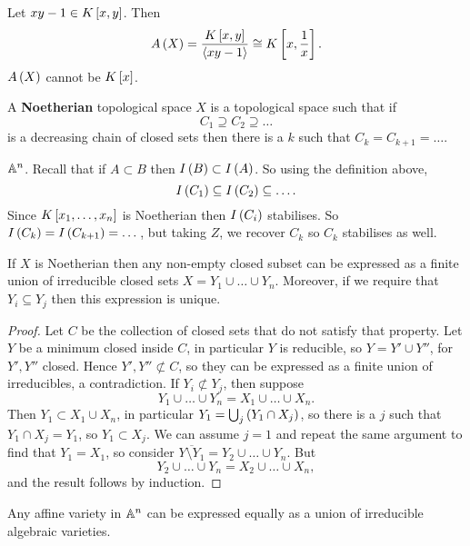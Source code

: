 \begin{example}
Let $ xy - 1 \in K\sb{x, y} $. Then
$$ A\rb{X} = \dfrac{K\sb{x, y}}{\ab{xy - 1}} \cong K\sb{x, \dfrac{1}{x}}. $$
$ A\rb{X} $ cannot be $ K\sb{x} $.
\end{example}

\begin{definition}
A \textbf{Noetherian} topological space $ X $ is a topological space such that if
$$ C_1 \supseteq C_2 \supseteq \dots $$
is a decreasing chain of closed sets then there is a $ k $ such that $ C_k = C_{k + 1} = \dots $.
\end{definition}

\begin{example}
$ \A^n $. Recall that if $ A \subset B $ then $ I\rb{B} \subset I\rb{A} $. So using the definition above,
$$ I\rb{C_1} \subseteq I\rb{C_2} \subseteq \dots. $$
Since $ K\sb{x_1, \dots, x_n} $ is Noetherian then $ I\rb{C_i} $ stabilises. So $ I\rb{C_k} = I\rb{C_{k + 1}} = \dots $, but taking $ Z $, we recover $ C_k $ so $ C_k $ stabilises as well.
\end{example}

\pagebreak

\begin{theorem}
If $ X $ is Noetherian then any non-empty closed subset can be expressed as a finite union of irreducible closed sets $ X = Y_1 \cup \dots \cup Y_n $. Moreover, if we require that $ Y_i \subseteq Y_j $ then this expression is unique.
\end{theorem}

\begin{proof}
Let $ C $ be the collection of closed sets that do not satisfy that property. Let $ Y $ be a minimum closed inside $ C $, in particular $ Y $ is reducible, so $ Y = Y' \cup Y'' $, for $ Y', Y'' $ closed. Hence $ Y', Y'' \not\subset C $, so they can be expressed as a finite union of irreducibles, a contradiction. If $ Y_i \not\subset Y_j $, then suppose
$$ Y_1 \cup \dots \cup Y_n = X_1 \cup \dots \cup X_n. $$
Then $ Y_1 \subset X_1 \cup X_n $, in particular $ Y_1 = \bigcup_j \rb{Y_1 \cap X_j} $, so there is a $ j $ such that $ Y_1 \cap X_j = Y_1 $, so $ Y_1 \subset X_j $. We can assume $ j = 1 $ and repeat the same argument to find that $ Y_1 = X_1 $, so consider $ \overline{Y \setminus Y_1} = Y_2 \cup \dots \cup Y_n $. But
$$ Y_2 \cup \dots \cup Y_n = X_2 \cup \dots \cup X_n, $$
and the result follows by induction.
\end{proof}

\begin{corollary}
Any affine variety in $ \A^n $ can be expressed equally as a union of irreducible algebraic varieties.
\end{corollary}


